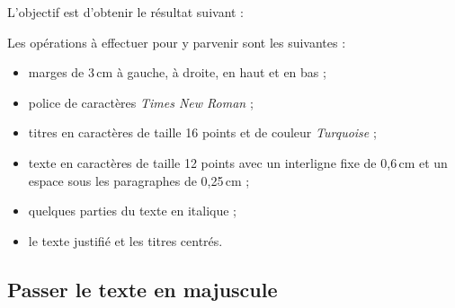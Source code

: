 L'objectif est d'obtenir le résultat suivant :

\begin{center}\label{modelePage}\end{center}


Les opérations à effectuer pour y parvenir sont les suivantes :

\begin{itemize}
\item marges de 3\,cm à gauche, à droite, en haut et en bas ;
\item police de caractères \emph{Times New Roman} ;  
\item titres en caractères de taille 16 points et de couleur \emph{Turquoise} ;
\item texte en caractères de taille 12 points avec un interligne fixe de 0,6\,cm et un espace sous les paragraphes de 0,25\,cm ;
\item quelques parties du texte en italique ; 
\item le texte justifié et les titres centrés.
\end{itemize}


\subsection{Passer le texte en majuscule}

